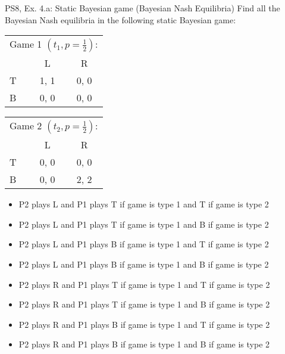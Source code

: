 \begin{frame}{PS8, Ex. 4.a: Static Bayesian game (Bayesian Nash Equilibria)}
    Find all the Bayesian Nash equilibria in the following static Bayesian game:
    \vspace{-4pt}
    \begin{table}
      \begin{tabular}{l|c|c|}
        \multicolumn{3}{c}{Game 1 $\left(t_1, p=\frac{1}{2}\right)$:}
        \\
        \multicolumn{1}{c}{} & \multicolumn{1}{c}{L} & \multicolumn{1}{c}{R} \\\cline{2-3}
        T & 1, 1 & 0, 0 \\\cline{2-3}
        B & 0, 0 & 0, 0 \\\cline{2-3}
      \end{tabular}
      \begin{tabular}{l|c|c|}
        \multicolumn{3}{c}{Game 2 $\left(t_2, p=\frac{1}{2}\right)$:}
        \\
        \multicolumn{1}{c}{} & \multicolumn{1}{c}{L} & \multicolumn{1}{c}{R} \\\cline{2-3}
        T & 0, 0 & 0, 0 \\\cline{2-3}
        B & 0, 0 & 2, 2 \\\cline{2-3}
      \end{tabular}
    \end{table}
    \vspace{-4pt}
    \begin{itemize}
      \item P2 plays L and P1 plays T if game is type 1 and T if game is type 2
      \item P2 plays L and P1 plays T if game is type 1 and B if game is type 2
      \item P2 plays L and P1 plays B if game is type 1 and T if game is type 2
      \item P2 plays L and P1 plays B if game is type 1 and B if game is type 2
      \item P2 plays R and P1 plays T if game is type 1 and T if game is type 2
      \item P2 plays R and P1 plays T if game is type 1 and B if game is type 2
      \item P2 plays R and P1 plays B if game is type 1 and T if game is type 2
      \item P2 plays R and P1 plays B if game is type 1 and B if game is type 2
    \end{itemize}
    \vspace{-4pt}

\end{frame}
